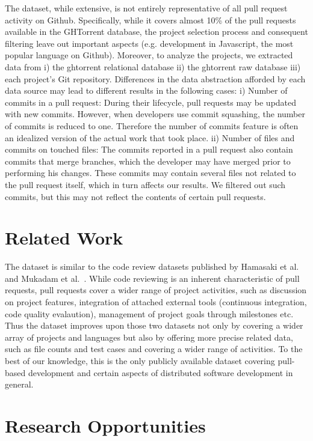 \documentclass{sig-alternate}
\begin{document}
The dataset, while extensive, is not entirely representative of all pull request
activity on Github. Specifically, while it covers almost 10\% of the pull
requests available in the GHTorrent database, the project selection process and
consequent filtering leave out important aspects (e.g. development in
Javascript, the most popular language on Github). Moreover, to analyze the
projects, we extracted data from i) the {\sc ght}orrent relational database ii)
the {\sc ght}orrent raw database iii) each project's Git repository.
Differences in the data abstraction afforded by each data source may lead to
different results in the following cases: i) Number of commits in a pull
request: During their lifecycle, pull requests may be updated with new commits.
However, when developers use commit squashing, the number of commits is reduced
to one. Therefore the number of commits feature is often an idealized version of
the actual work that took place. ii) Number of files and commits on touched
files: The commits reported in a pull request also contain commits that merge
branches, which the developer may have merged prior to performing his changes.
These commits may contain several files not related to the pull request itself,
which in turn affects our results. We  filtered out such commits, but this may
not reflect the contents of certain pull requests.

\section{Related Work}
\label{sec:rel}

The \pullreqs dataset is similar to the code review datasets published by
Hamasaki et al.~\cite{Hamas13} and Mukadam et al.~\cite{Mukad13}.  While code
reviewing is an inherent characteristic of pull requests, pull requests cover a
wider range of project activities, such as discussion on project features,
integration of attached external tools (continuous integration, code quality
evalaution), management of project goals through milestones etc.  Thus the
\pullreqs dataset improves upon those two datasets not only by covering a wider
array of projects and languages but also by offering more precise related data,
such as file counts and test cases and covering a wider range of activities. To
the best of our knowledge, this is the only publicly available dataset covering
pull-based development and certain aspects of distributed software development
in general.

\section{Research Opportunities}
\end{document}
